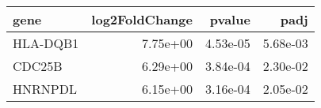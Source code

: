 \begin{tabular}{lrrr}
\toprule
    gene &  log2FoldChange &   pvalue &     padj \\
\midrule
HLA-DQB1 &        7.75e+00 & 4.53e-05 & 5.68e-03 \\
  CDC25B &        6.29e+00 & 3.84e-04 & 2.30e-02 \\
 HNRNPDL &        6.15e+00 & 3.16e-04 & 2.05e-02 \\
\bottomrule
\end{tabular}
